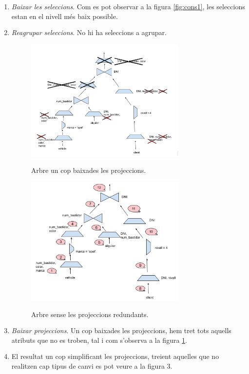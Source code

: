 \documentclass[12pt]{article}
\begin{document}
\begin{enumerate}
	\item \textit{Baixar les seleccions}.
	Com es pot observar a la figura \ref{fig:cons1}, les seleccions estan en el nivell més baix possible.
	\item \textit{Reagrupar seleccions}. No hi ha seleccions a agrupar.
	\begin{figure}[H]
		\centering
		\includegraphics[width=8cm]{imgs/img2.png}
		\label{fig:consdos}
		\caption{Arbre un cop baixades les projeccions.}
	\end{figure}

	\begin{figure}[H]
		\centering
		\includegraphics[width=8cm]{imgs/consnum.png}
		\label{fig:consre}
		\caption{Arbre sense les projeccions redundants.}
	\end{figure}
	\item \textit{Baixar projeccions}. 
	Un cop baixades les projeccions, hem tret tots aquells atributs que no es troben, tal i com s'observa a la figura \ref{fig:consdos}.
	\item El resultat un cop simplificant les projeccions, treient aquelles que no realitzen cap tipus de canvi es pot veure a la figura 3.

\end{enumerate}
\end{document}
